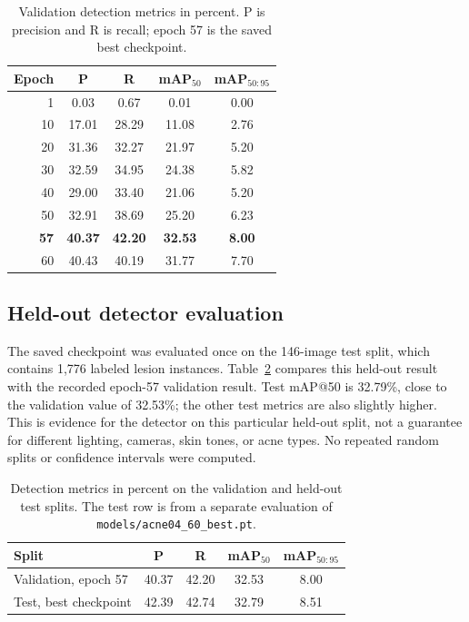 \documentclass[10pt,twocolumn,letterpaper]{article}
\begin{document}
\begin{table}[t]
    \centering
    \small
    \setlength{\tabcolsep}{4pt}
    \begin{tabular}{rcccc}
        \toprule
        Epoch & P & R & mAP$_{50}$ & mAP$_{50:95}$\\
        \midrule
        1 & 0.03 & 0.67 & 0.01 & 0.00\\
        10 & 17.01 & 28.29 & 11.08 & 2.76\\
        20 & 31.36 & 32.27 & 21.97 & 5.20\\
        30 & 32.59 & 34.95 & 24.38 & 5.82\\
        40 & 29.00 & 33.40 & 21.06 & 5.20\\
        50 & 32.91 & 38.69 & 25.20 & 6.23\\
        \textbf{57} & \textbf{40.37} & \textbf{42.20}
          & \textbf{32.53} & \textbf{8.00}\\
        60 & 40.43 & 40.19 & 31.77 & 7.70\\
        \bottomrule
    \end{tabular}
    \caption{Validation detection metrics in percent. P is precision
    and R is recall; epoch 57 is the saved best checkpoint.}
    \label{tab:epochs}
\end{table}

\subsection{Held-out detector evaluation}

The saved checkpoint was evaluated once on the 146-image test split,
which contains 1,776 labeled lesion instances.
Table~\ref{tab:test} compares this held-out result with the recorded
epoch-57 validation result. Test mAP@50 is 32.79\%, close to
the validation value of 32.53\%; the other test metrics are also
slightly higher. This is evidence for the detector on this particular
held-out split, not a guarantee for different lighting, cameras, skin
tones, or acne types. No repeated random splits or confidence intervals
were computed.

\begin{table}[t]
    \centering
    \small
    \setlength{\tabcolsep}{4pt}
    \begin{tabular}{lcccc}
        \toprule
        Split & P & R & mAP$_{50}$ & mAP$_{50:95}$\\
        \midrule
        Validation, epoch 57 & 40.37 & 42.20 & 32.53 & 8.00\\
        Test, best checkpoint & 42.39 & 42.74 & 32.79 & 8.51\\
        \bottomrule
    \end{tabular}
    \caption{Detection metrics in percent on the validation and
    held-out test splits. The test row is from a separate evaluation
    of \texttt{models/acne04\_60\_best.pt}.}
    \label{tab:test}
\end{table}
\end{document}

